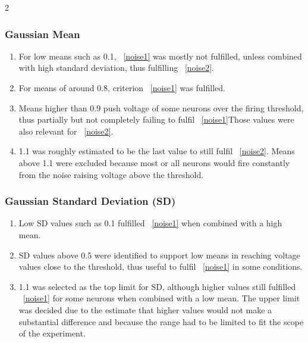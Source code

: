 \documentclass[12pt,a4paper]{article}
\begin{document}
\begin{multicols}{2}
        \subsubsection{Gaussian Mean}
            \begin{enumerate}[label=\alph*), labelwidth=1.5em, labelsep=1.5pt, leftmargin=1em, itemindent=0pt, rightmargin=0pt, itemsep=5pt, parsep=0pt, topsep=2pt, partopsep=0pt]
                \item\label{mean1} For low means such as 0.1, ~\ref{noise1} was mostly not fulfilled, unless combined with high standard deviation, thus fulfilling ~\ref{noise2}.
                \item\label{mean2} For means of around 0.8, criterion ~\ref{noise1} was fulfilled.
                \item\label{mean3} Means higher than 0.9 push voltage of some neurons over the firing threshold, thus partially but not completely failing to fulfil ~\ref{noise1}Those values were also relevant for ~\ref{noise2}.
                \item\label{mean4} 1.1 was roughly estimated to be the last value to still fulfil ~\ref{noise2}. Means above 1.1 were excluded because most or all neurons would fire constantly from the noise raising voltage above the threshold.
            \end{enumerate}
            
        \subsubsection{Gaussian Standard Deviation (SD)}
            \begin{enumerate}[label=\alph*), labelwidth=1.5em, labelsep=1.5pt, leftmargin=1em, itemindent=0pt, rightmargin=0pt, itemsep=5pt, parsep=0pt, topsep=2pt, partopsep=0pt]
                \item\label{sd1} Low SD values such as 0.1 fulfilled ~\ref{noise1} when combined with a high mean.
                \item\label{sd2} SD values above 0.5 were identified to support low means in reaching voltage values close to the threshold, thus useful to fulfil ~\ref{noise1} in some conditions.
                \item\label{sd1} 1.1 was selected as the top limit for SD, although higher values still fulfilled ~\ref{noise1} for some neurons when combined with a low mean. The upper limit was decided due to the estimate that higher values would not make a substantial difference and because the range had to be limited to fit the scope of the experiment.
            \end{enumerate}


\end{multicols}
\end{document}
